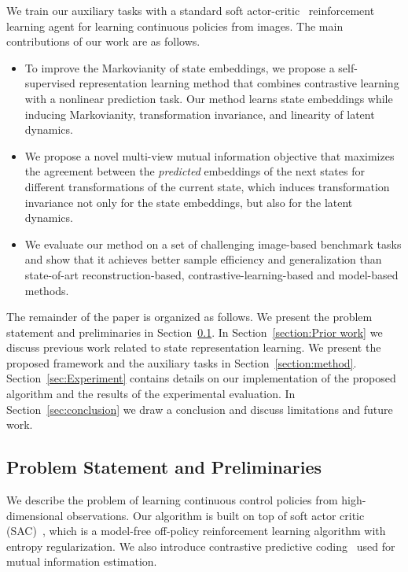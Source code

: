 \documentclass[a4paper,12pt]{article}
\begin{document}
We train our auxiliary tasks  with a standard soft actor-critic~\cite{haarnoja2018soft} reinforcement learning agent for learning continuous policies from images. The main contributions of our work are as follows.
\begin{itemize}
    \item To improve the Markovianity of state embeddings, we propose a self-supervised representation learning method that combines contrastive learning with a nonlinear prediction task. Our method learns state embeddings while inducing Markovianity, transformation invariance, and linearity of latent dynamics.
    \item We propose a novel multi-view mutual information objective that maximizes the agreement between the \emph{predicted} embeddings of the next states for different transformations of the current state, which induces transformation invariance not only for the state embeddings, but also for the latent dynamics.
    \item We evaluate our method on a set of challenging image-based benchmark tasks and show that it achieves better sample efficiency and generalization than state-of-art reconstruction-based, contrastive-learning-based and model-based methods.
\end{itemize}

The remainder of the paper is organized as follows. We present the problem statement and preliminaries in Section~\ref{Problem statement and notation}. In Section~\ref{section:Prior work} we discuss previous work related to state representation learning. We present the proposed framework and the auxiliary tasks in Section~\ref{section:method}. Section~\ref{sec:Experiment} contains details on our implementation of the proposed algorithm and the results of the experimental evaluation. In Section~\ref{sec:conclusion} we draw a conclusion and discuss limitations and future work.

\subsection{Problem Statement and Preliminaries}
\label{Problem statement and notation}
We describe the problem of learning continuous control policies from high-dimensional observations. Our algorithm is built on top of soft actor critic (SAC)~\cite{haarnoja2018soft}, which is a model-free off-policy reinforcement learning algorithm with entropy regularization. We also introduce contrastive predictive coding~\cite{oord2018} used for mutual information estimation.
\end{document}

